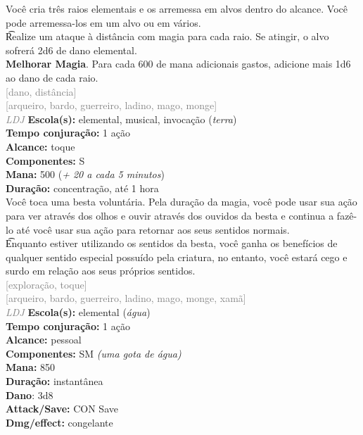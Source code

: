 \documentclass{RPG_Adventure}[2021/10/20]
\begin{document}
{\normalsize Você cria três raios elementais e os arremessa em alvos dentro do alcance. Você pode arremessa-los em um alvo ou em vários.\\\t Realize um ataque à distância com magia para cada raio. Se atingir, o alvo sofrerá 2d6 de dano elemental.\\\t \textbf{Melhorar Magia}. Para cada 600 de mana adicionais gastos, adicione mais 1d6 ao dano de cada raio.\\}
{\scriptsize \textcolor{gray}{[dano, distância]\\}}
{\scriptsize \textcolor{gray}{[arqueiro, bardo, guerreiro, ladino, mago, monge]\\}}
{\tiny \textcolor{gray}{\textit{LDJ}}}\jump{}
{\small \t \textbf{Escola(s):} elemental, musical, invocação (\textit{terra})\\\t \textbf{Tempo conjuração:} 1 ação\\\t \textbf{Alcance:} toque\\\t \textbf{Componentes:} S\\\t \textbf{Mana:} 500 (\textit{+ 20 a cada 5 minutos})\\\t \textbf{Duração:} concentração, até 1 hora\\}
{\normalsize Você toca uma besta voluntária. Pela duração da magia, você pode usar sua ação para ver através dos olhos e ouvir através dos ouvidos da besta e continua a fazê-lo até você usar sua ação para retornar aos seus sentidos normais.\\\t Enquanto estiver utilizando os sentidos da besta, você ganha os benefícios de qualquer sentido especial possuído pela criatura, no entanto, você estará cego e surdo em relação aos seus próprios sentidos.\\}
{\scriptsize \textcolor{gray}{[exploração, toque]\\}}
{\scriptsize \textcolor{gray}{[arqueiro, bardo, guerreiro, ladino, mago, monge, xamã]\\}}
{\tiny \textcolor{gray}{\textit{LDJ}}}\jump{}
{\small \t \textbf{Escola(s):} elemental (\textit{água})\\\t \textbf{Tempo conjuração:} 1 ação\\\t \textbf{Alcance:} pessoal\\\t \textbf{Componentes:} SM \textit{(uma gota de água)}\\\t \textbf{Mana:} 850\\\t \textbf{Duração:} instantânea\\\t \textbf{Dano}: 3d8\\\t \textbf{Attack/Save:} CON Save\\\t \textbf{Dmg/effect:} congelante\\}
\end{document}
